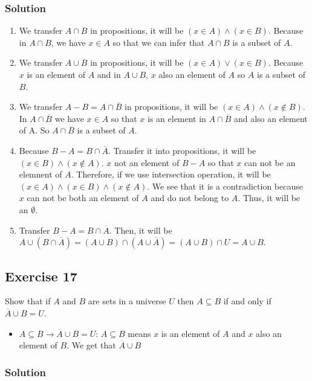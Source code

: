 \documentclass{article}
\theoremstyle{mytheoremstyle}
\theoremstyle{mytheoremstyle}
\theoremstyle{myproblemstyle}
\begin{document}
    \subsubsection*{Solution}
        \begin{enumerate} [label = (\alph*)]
            \item We transfer \(A \cap B\) in propositions, it will be \((x \in A) \land (x \in B)\).
            Because in \(A \cap B\), we have \(x \in A \) so that we can infer that \(A \cap B\) is a subset of \(A\).
            \item We transfer \(A \cup B\) in propositions, it will be \((x \in A) \lor (x \in B)\).
            Because \(x\) is an element of \(A\) and in \(A \cup B\), \(x\) also an element of \(A\) so \(A\) is a subset of \(B\).
            \item We transfer \(A - B = A \cap \overline{B}\) in propositions, it will be \((x \in A) \land (x \notin B)\).
            In \(A \cap \overline{B}\) we have \(x \in A\) so that \(x\) is an element in \(A \cap \overline{B}\) and also an element of A.
            So \(A \cap \overline{B}\) is a subset of \(A\).
            \item Because \(B - A = B \cap \overline{A}\). Transfer it into propositions, it will be \((x \in B) \land (x \notin A)\).
            \(x\) not an element of \(B - A\) so that \(x\) can not be an elemnent of \(A\). Therefore, if we
            use intersection operation, it will be \((x \in A) \land (x \in B) \land (x \notin A)\). We see that it is a
            contradiction because \(x\) can not be both an element of \(A\) and do not belong to \(A\). Thus, it will be an \(\emptyset\).
            \item Transfer \(B - A = B \cap \overline{A}\). Then, it will be \(A \cup (B \cap \overline{A}) = (A \cup B) \cap (A \cup 
            \overline{A}) = (A \cup B) \cap U = A \cup B\).
        \end{enumerate}
    \subsection*{Exercise 17}
        Show that if \(A\) and \(B\) are sets in a universe \(U\) then \(A \subseteq B\) if and only if \(\overline{A} \cup B = U\).
        \begin{itemize}
            \item \(A \subseteq B \to \overline{A}\cup B=U\): \(A \subseteq B\) means \(x\) is an element of \(A\) and \(x\) also an element of \(B\).
            We get that \(\overline{A} \cup B\)
        \end{itemize}
    \subsubsection*{Solution}
\end{document}
